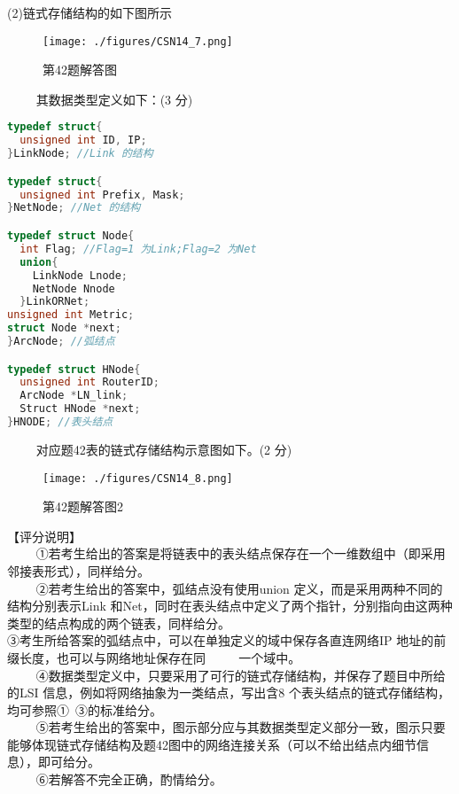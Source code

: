 (2)链式存储结构的如下图所示
\begin{figure}[ht]
\centering
\texttt{[image: ./figures/CSN14\_7.png]}
\caption{第42题解答图} \label{CSN14_fig7}
\end{figure}
$\qquad$ 其数据类型定义如下：(3 分) \\
\begin{lstlisting}[language=cpp]
typedef struct{
  unsigned int ID, IP;
}LinkNode; //Link 的结构

typedef struct{
  unsigned int Prefix, Mask;
}NetNode; //Net 的结构

typedef struct Node{
  int Flag; //Flag=1 为Link;Flag=2 为Net
  union{
    LinkNode Lnode;
    NetNode Nnode
  }LinkORNet;
unsigned int Metric;
struct Node *next;
}ArcNode; //弧结点

typedef struct HNode{
  unsigned int RouterID;
  ArcNode *LN_link;
  Struct HNode *next;
}HNODE; //表头结点
\end{lstlisting}
$\qquad$ 对应题42表的链式存储结构示意图如下。(2 分)
\begin{figure}[ht]
\centering
\texttt{[image: ./figures/CSN14\_8.png]}
\caption{第42题解答图2} \label{CSN14_fig8}
\end{figure}
【评分说明】 \\
$\qquad$ ①若考生给出的答案是将链表中的表头结点保存在一个一维数组中（即采用邻接表形式），同样给分。  \\
$\qquad$ ②若考生给出的答案中，弧结点没有使用union 定义，而是采用两种不同的结构分别表示Link 和Net，同时在表头结点中定义了两个指针，分别指向由这两种类型的结点构成的两个链表，同样给分。 \\
③考生所给答案的弧结点中，可以在单独定义的域中保存各直连网络IP 地址的前缀长度，也可以与网络地址保存在同 $\qquad$ 一个域中。 \\
$\qquad$ ④数据类型定义中，只要采用了可行的链式存储结构，并保存了题目中所给的LSI 信息，例如将网络抽象为一类结点，写出含8 个表头结点的链式存储结构，均可参照①~③的标准给分。 \\
$\qquad$ ⑤若考生给出的答案中，图示部分应与其数据类型定义部分一致，图示只要能够体现链式存储结构及题42图中的网络连接关系（可以不给出结点内细节信息），即可给分。 \\
$\qquad$ ⑥若解答不完全正确，酌情给分。

